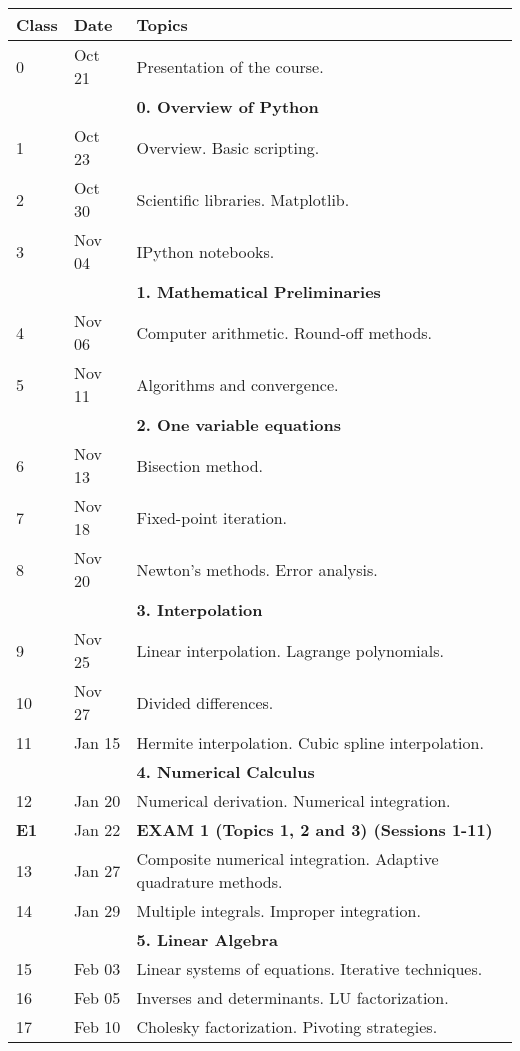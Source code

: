 \documentclass[a4,useAMS,usenatbib,usegraphicx,12pt]{article}
\begin{document}
\begin{table}[!ht]
\begin{small}
\begin{flushleft}
\begin{center}
  \begin{tabular}{l  l  l} \hline\hline
	\centering\textbf{Class} & \textbf{Date} & \textbf{Topics} \\ \hline
	0 & Oct 21& Presentation of the course. \\
	& & \textbf{0. Overview of Python} \\
	1 & Oct 23& Overview. Basic scripting. \\
	2 & Oct 30& Scientific libraries. Matplotlib. \\
	3 & Nov 04& IPython notebooks. \\
	& & \textbf{1. Mathematical Preliminaries} \\
	4 & Nov 06& Computer arithmetic. Round-off methods. \\
	5 & Nov 11& Algorithms and convergence. \\
	& & \textbf{2. One variable equations} \\
	6 & Nov 13& Bisection method. \\
	7 & Nov 18& Fixed-point iteration. \\
	8 & Nov 20& Newton's methods. Error analysis. \\
	& & \textbf{3. Interpolation} \\
	9 & Nov 25& Linear interpolation. Lagrange polynomials. \\
	10 & Nov 27& Divided differences. \\
	11 & Jan 15& Hermite interpolation. Cubic spline interpolation. \\
	& & \textbf{4. Numerical Calculus} \\
	12 & Jan 20& Numerical derivation. Numerical integration. \\
	\textbf{E1} & Jan 22& \textbf{EXAM 1 (Topics 1, 2 and 3) (Sessions 1-11)} \\
	13 & Jan 27& Composite numerical integration. Adaptive quadrature methods. \\
	14 & Jan 29& Multiple integrals. Improper integration. \\
	& & \textbf{5. Linear Algebra} \\
	15 & Feb 03& Linear systems of equations. Iterative techniques. \\
	16 & Feb 05& Inverses and determinants. LU factorization. \\
	17 & Feb 10& Cholesky factorization. Pivoting strategies. \\

\end{tabular}
\end{center}
\end{flushleft}
\end{small}
\end{table}
\end{document}

